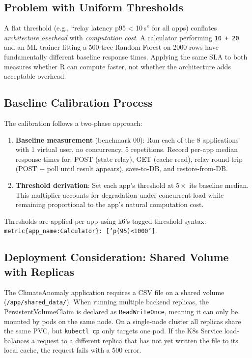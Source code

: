 \documentclass[11pt,a4paper]{article}
\begin{document}
\subsection{Problem with Uniform Thresholds}

A flat threshold (e.g., ``relay latency p95 < 10\,s'' for all apps)
conflates \emph{architecture overhead} with \emph{computation cost}.
A calculator performing \texttt{10 + 20} and an ML trainer fitting a
500-tree Random Forest on 2000 rows have fundamentally different
baseline response times. Applying the same SLA to both measures
whether R can compute faster, not whether the architecture adds
acceptable overhead.

\subsection{Baseline Calibration Process}

The calibration follows a two-phase approach:

\begin{enumerate}
  \item \textbf{Baseline measurement} (benchmark 00): Run each of the
        8 applications with 1 virtual user, no concurrency, 5 repetitions.
        Record per-app median response times for: POST (state relay),
        GET (cache read), relay round-trip (POST + poll until result
        appears), save-to-DB, and restore-from-DB.

  \item \textbf{Threshold derivation}: Set each app's threshold at
        $5\times$ its baseline median. This multiplier accounts for
        degradation under concurrent load while remaining proportional
        to the app's natural computation cost.
\end{enumerate}

\noindent Thresholds are applied per-app using k6's tagged threshold
syntax: \texttt{metric\{app\_name:Calculator\}: ['p(95)<1000']}.

\subsection{Deployment Consideration: Shared Volume with Replicas}

The ClimateAnomaly application requires a CSV file on a shared volume
(\texttt{/app/shared\_data/}). When running multiple backend replicas,
the PersistentVolumeClaim is declared as \texttt{ReadWriteOnce}, meaning
it can only be mounted by pods on the same node. On a single-node cluster
all replicas share the same PVC, but \texttt{kubectl cp} only targets one
pod. If the K8s Service load-balances a request to a different replica
that has not yet written the file to its local cache, the request fails
with a 500 error.
\end{document}
